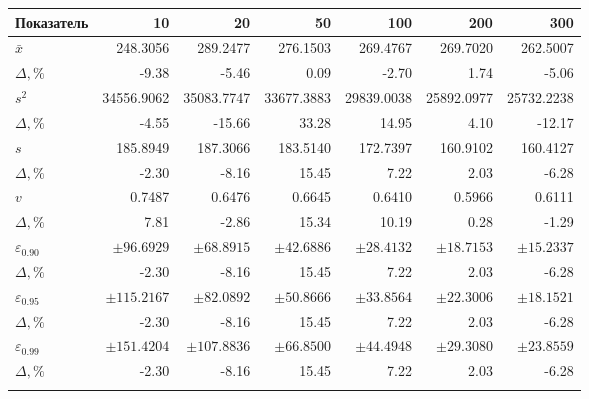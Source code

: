 \begin{tabular}{lrrrrrr}\toprule
Показатель & 10 & 20 & 50 & 100 & 200 & 300 \\\midrule
$\bar x$ & 248.3056 & 289.2477 & 276.1503 & 269.4767 & 269.7020 & 262.5007 \\
$\Delta,\%$ & -9.38 & -5.46 & 0.09 & -2.70 & 1.74 & -5.06 \\\addlinespace
$s^2$ & 34556.9062 & 35083.7747 & 33677.3883 & 29839.0038 & 25892.0977 & 25732.2238 \\
$\Delta,\%$ & -4.55 & -15.66 & 33.28 & 14.95 & 4.10 & -12.17 \\\addlinespace
$s$ & 185.8949 & 187.3066 & 183.5140 & 172.7397 & 160.9102 & 160.4127 \\
$\Delta,\%$ & -2.30 & -8.16 & 15.45 & 7.22 & 2.03 & -6.28 \\\addlinespace
$v$ & 0.7487 & 0.6476 & 0.6645 & 0.6410 & 0.5966 & 0.6111 \\
$\Delta,\%$ & 7.81 & -2.86 & 15.34 & 10.19 & 0.28 & -1.29 \\\addlinespace
$\varepsilon_{0.90}$ &  $\pm 96.6929$ &  $\pm 68.8915$ &  $\pm 42.6886$ &  $\pm 28.4132$ &  $\pm 18.7153$ &  $\pm 15.2337$ \\
$\Delta,\%$ & -2.30 & -8.16 & 15.45 & 7.22 & 2.03 & -6.28 \\\addlinespace
$\varepsilon_{0.95}$ &  $\pm 115.2167$ &  $\pm 82.0892$ &  $\pm 50.8666$ &  $\pm 33.8564$ &  $\pm 22.3006$ &  $\pm 18.1521$ \\
$\Delta,\%$ & -2.30 & -8.16 & 15.45 & 7.22 & 2.03 & -6.28 \\\addlinespace
$\varepsilon_{0.99}$ &  $\pm 151.4204$ &  $\pm 107.8836$ &  $\pm 66.8500$ &  $\pm 44.4948$ &  $\pm 29.3080$ &  $\pm 23.8559$ \\
$\Delta,\%$ & -2.30 & -8.16 & 15.45 & 7.22 & 2.03 & -6.28 \\\addlinespace
\bottomrule\end{tabular}